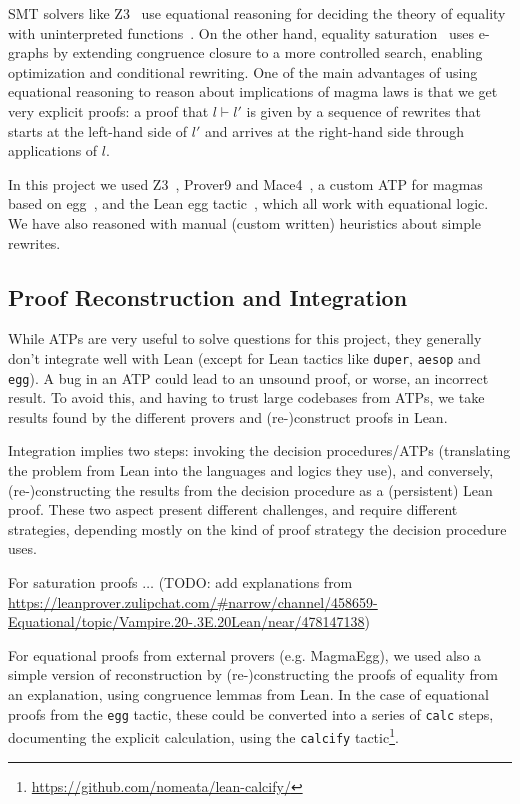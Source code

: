 SMT solvers like Z3~\cite{DBLP:conf/tacas/MouraB08} use equational reasoning for deciding the theory of equality with uninterpreted functions~\cite{DBLP:series/txtcs/KroeningS16,DBLP:conf/cade/MouraB07}.
On the other hand, equality saturation~\cite{DBLP:journals/pacmpl/WillseyNWFTP21} uses e-graphs by extending congruence closure to a more controlled search, enabling optimization and conditional rewriting.
One of the main advantages of using equational reasoning to reason about implications of magma laws is that we get very explicit proofs: a proof that $l \vdash l'$ is given by a sequence of rewrites that starts at the left-hand side of $l'$ and arrives at the right-hand side through applications of $l$.

In this project we used Z3~\cite{DBLP:conf/tacas/MouraB08}, Prover9 and Mace4~\cite{prover9-mace4}, a custom ATP for magmas based on egg~\cite{DBLP:journals/pacmpl/WillseyNWFTP21}, and the Lean egg tactic~\cite{DBLP:journals/pacmpl/KoehlerGBGTS24,rossel2024bridging}, which all work with equational logic. We have also reasoned with manual (custom written) heuristics about simple rewrites.

\subsection{Proof Reconstruction and Integration}
\label{sec:proof-reconstruction}

While ATPs are very useful to solve questions for this project, they generally don't integrate well with Lean (except for Lean tactics like \texttt{duper}, \texttt{aesop} and \texttt{egg}).
A bug in an ATP could lead to an unsound proof, or worse, an incorrect result.
To avoid this, and having to trust large codebases from ATPs, we take results found by the different provers and (re-)construct proofs in Lean.

Integration implies two steps: invoking the decision procedures/ATPs (translating the problem from Lean into the languages and logics they use), and conversely, (re-)constructing the results from the decision procedure as a (persistent) Lean proof.
These two aspect present different challenges, and require different strategies, depending mostly on the kind of proof strategy the decision procedure uses.

For saturation proofs $\ldots$ (TODO: add explanations from \url{https://leanprover.zulipchat.com/#narrow/channel/458659-Equational/topic/Vampire.20-.3E.20Lean/near/478147138})

For equational proofs from external provers (e.g. MagmaEgg), we used also a simple version of reconstruction by (re-)constructing the proofs of equality from an explanation, using congruence lemmas from Lean.
In the case of equational proofs from the \texttt{egg} tactic, these could be converted into a series of \texttt{calc} steps, documenting the explicit calculation, using the \texttt{calcify} tactic\footnote{\url{https://github.com/nomeata/lean-calcify/}}.


